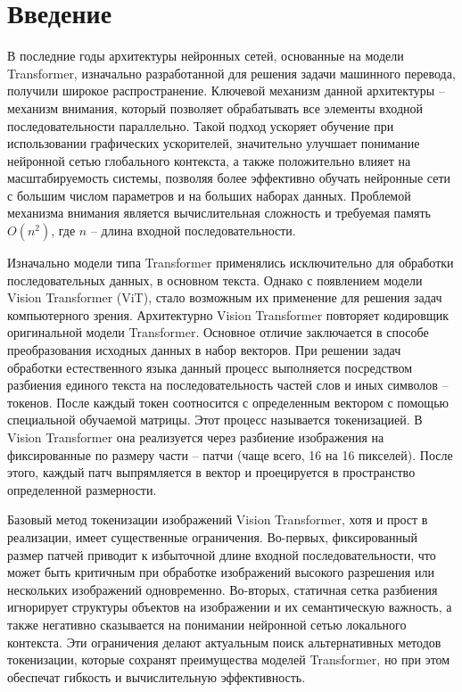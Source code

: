 
\section*{Введение}

В последние годы архитектуры нейронных сетей, основанные на модели Transformer, изначально разработанной для решения задачи машинного перевода, получили широкое распространение. Ключевой механизм данной архитектуры – механизм внимания, который позволяет обрабатывать все элементы входной последовательности параллельно. Такой подход ускоряет обучение при использовании графических ускорителей, значительно улучшает понимание нейронной сетью глобального контекста, а также положительно влияет на масштабируемость системы, позволяя более эффективно обучать нейронные сети с большим числом параметров и на больших наборах данных.  Проблемой механизма внимания является вычислительная сложность и требуемая память $O(n^2)$, где $n$ – длина входной последовательности.

Изначально модели типа Transformer применялись исключительно для обработки последовательных данных, в основном текста. Однако с появлением модели Vision Transformer (ViT),  стало возможным их применение для решения задач компьютерного зрения.  Архитектурно Vision Transformer повторяет кодировщик оригинальной модели Transformer. Основное отличие заключается в способе преобразования исходных данных в набор векторов. При решении задач обработки естественного языка данный процесс выполняется посредством разбиения единого текста на последовательность частей слов и иных символов – токенов. После каждый токен соотносится с определенным вектором с помощью специальной обучаемой матрицы. Этот процесс называется токенизацией. В Vision Transformer она реализуется через разбиение изображения на фиксированные по размеру части – патчи (чаще всего, 16 на 16 пикселей). После этого, каждый патч выпрямляется в вектор и проецируется в пространство определенной размерности.

Базовый метод токенизации изображений Vision Transformer, хотя и прост в реализации, имеет существенные ограничения. Во-первых, фиксированный размер патчей приводит к избыточной длине входной последовательности, что может быть критичным при обработке изображений высокого разрешения или нескольких изображений одновременно. Во-вторых, статичная сетка разбиения игнорирует структуры объектов на изображении  и их семантическую важность, а также негативно сказывается на понимании нейронной сетью локального контекста. Эти ограничения делают актуальным поиск альтернативных методов токенизации, которые сохранят преимущества моделей Transformer, но при этом обеспечат гибкость и вычислительную эффективность.

